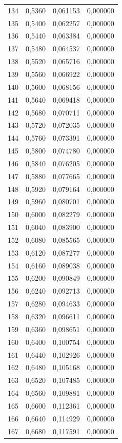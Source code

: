 \begin{tabular}{lrrr}
134 & 0,5360 & 0,061153 & 0,000000 \\
135 & 0,5400 & 0,062257 & 0,000000 \\
136 & 0,5440 & 0,063384 & 0,000000 \\
137 & 0,5480 & 0,064537 & 0,000000 \\
138 & 0,5520 & 0,065716 & 0,000000 \\
139 & 0,5560 & 0,066922 & 0,000000 \\
140 & 0,5600 & 0,068156 & 0,000000 \\
141 & 0,5640 & 0,069418 & 0,000000 \\
142 & 0,5680 & 0,070711 & 0,000000 \\
143 & 0,5720 & 0,072035 & 0,000000 \\
144 & 0,5760 & 0,073391 & 0,000000 \\
145 & 0,5800 & 0,074780 & 0,000000 \\
146 & 0,5840 & 0,076205 & 0,000000 \\
147 & 0,5880 & 0,077665 & 0,000000 \\
148 & 0,5920 & 0,079164 & 0,000000 \\
149 & 0,5960 & 0,080701 & 0,000000 \\
150 & 0,6000 & 0,082279 & 0,000000 \\
151 & 0,6040 & 0,083900 & 0,000000 \\
152 & 0,6080 & 0,085565 & 0,000000 \\
153 & 0,6120 & 0,087277 & 0,000000 \\
154 & 0,6160 & 0,089038 & 0,000000 \\
155 & 0,6200 & 0,090849 & 0,000000 \\
156 & 0,6240 & 0,092713 & 0,000000 \\
157 & 0,6280 & 0,094633 & 0,000000 \\
158 & 0,6320 & 0,096611 & 0,000000 \\
159 & 0,6360 & 0,098651 & 0,000000 \\
160 & 0,6400 & 0,100754 & 0,000000 \\
161 & 0,6440 & 0,102926 & 0,000000 \\
162 & 0,6480 & 0,105168 & 0,000000 \\
163 & 0,6520 & 0,107485 & 0,000000 \\
164 & 0,6560 & 0,109881 & 0,000000 \\
165 & 0,6600 & 0,112361 & 0,000000 \\
166 & 0,6640 & 0,114929 & 0,000000 \\
167 & 0,6680 & 0,117591 & 0,000000 \\

\end{tabular}
